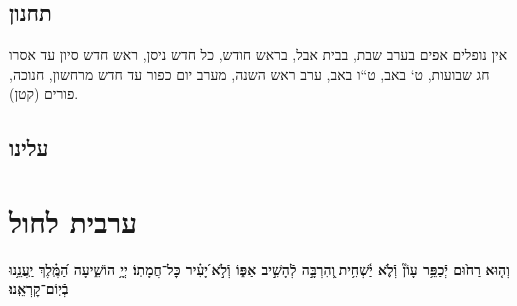 \documentclass[twoside, openany, parskip=half, 11pt]{book}
\begin{document}
\section*{ תחנון }

\begin{scriptsize}
\textsf{אין נופלים אפים בערב שבת, בבית אבל, בראש חודש, כל חדש ניסן, ראש חדש סיון עד אסרו חג שבועות, ט` באב, ט``ו באב, ערב ראש השנה, מערב יום כפור עד חדש מרחשון, חנוכה, פורים (קטן).}

\end{scriptsize}


\nefilasapayim

\nextpage
\shomeryisroel

\fullkaddish

\vspace{\baselineskip}

\label{mincha aleinu}
\section*{ עלינו }

\aleinu


\vfill

\quad{}\quad{}

\chapter[ערבית לחול]{ ערבית לחול }

\textbf{וְה֤וּא}\textbf{
רַח֙וּם יְֿכַפֵּ֥ר עָוֹן֘ וְֿלֹ֢א יַ֫שְׁחִ֥ית ֖וְהִרְבָּ֣ה לְֿהָשִׁ֣יב אַפּ֑וֹ וְֿלֹ֣א ֝יָעִ֗יר כׇּל־חֲמָתֽוֹ׃ יְיָ֥ הוֹשִׁ֑יעָה הַ֝מֶּֽ֗לֶךְ יַֽעֲנֵ֥נוּ בְֿיֽוֹם־קׇרְאֵֽנוּ׃}


\barachu

\newcommand{\hamaarivaravim}{
\firstword{בָּרוּךְ}
אַתָּה יְיָ אֱלֹהֵֽינוּ מֶֽלֶךְ הָעוֹלָם אֲשֶׁר בִּדְבָרוֹ מַעֲרִיב עֲרָבִים בְּֿחׇכְמָה פּוֹתֵֽחַ שְֿׁעָרִים וּבִתְבוּנָה מְֿשַׁנֶּה עִתִּים וּמַחֲלִיף אֶת־הַזְּֿמַנִּים וּמְסַדֵּר אֶת־הַכּוֹכָבִים בְּֿמִשְׁמְֿרוֹתֵֽיהֶם בָּרָקִֽיעַ כְּֿרְֿצוֹנוֹ: בּוֹרֵא יוֹם וָלָֽיְֿלָה גּוֹלֵל אוֹר מִפְּֿנֵי חֹֽשֶׁךְ וְֿחֹֽשֶׁךְ מִפְּֿנֵי אוֹר: וּמַעֲבִיר יוֹם וּמֵֽבִיא לָֽיְֿלָה וּמַבְדִּיל בֵּין יוֹם וּבֵין לָֽיְֿלָה יְיָ צְֿבָאוֹת שְֿׁמוֹ:
\adforn{14}
אֵל חַי וְֿקַיָּם תָּמִיד יִמְלוֹךְ עָלֵֽינוּ לְֿעוֹלָם וָעֶד: בָּרוּךְ אַתָּה יְיָ הַמַּעֲרִיב עֲרָבִים:
}

\newcommand{\ahavasolam}{
\firstword{אַהֲבַת}
עוֹלָם בֵּית יִשְׂרָאֵל עַמְּֿךָ אָהַבְתָּ: תּוֹרָה וּמִצְוֹת חֻקִּים וּמִשְׁפָּטִים אוֹתָֽנוּ לִמַֽדְתָּ: עַל כֵּן יְיָ אֱלֹהֵֽינוּ בְּֿשָׁכְֿבֵּֽנוּ וּבְקוּמֵֽנוּ נָשִֽׂיחַ בְּֿחֻקֶּיךָ וְֿנִשְׂמַח בְּֿדִבְרֵי תוֹרָתֶֽךָ וּבְמִצְוֹתֶֽיךָ לְֿעוֹלָם וָעֶד: כִּי הֵם חַיֵּֽינוּ וְֿאֹֽרֶךְ יָמֵֽינוּ וּבָהֶם נֶהְגֶּה יוֹמָם וָלָֽיְֿלָה:
\adforn{14}
וְֿאַהֲבָתְֿךָ אַל תָּסִיר מִמֶּֽנּוּ לְֿעוֹלָמִים: בָּרוּךְ אַתָּה יְיָ אוֹהֵב, עַמּוֹ יִשְׂרָאֵל:
}
\end{document}
